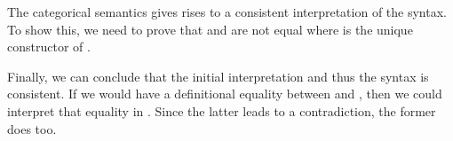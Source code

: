 
The categorical semantics gives rises to a consistent interpretation of the syntax.
To show this, we need to prove that   and   are not equal where  is the unique constructor of .

\begin{code}%
\>[0]\AgdaSpace{}%
\AgdaSymbol{:}\AgdaSpace{}%
\AgdaSpace{}%
\<%
\end{code}


Finally, we can conclude that the initial interpretation and thus the syntax is consistent.
If we would have a definitional equality between  and , then we could interpret that equality in .
Since the latter leads to a contradiction, the former does too.

\begin{code}%
\>[0]\AgdaSpace{}%
\AgdaSymbol{:}\AgdaSpace{}%
\AgdaSpace{}%
\<%
\\
\>[0]\AgdaSpace{}%
\AgdaSpace{}%
\AgdaSymbol{=}\AgdaSpace{}%
\AgdaSpace{}%
\AgdaSymbol{(}\AgdaSpace{}%
\AgdaSpace{}%
\AgdaSpace{}%
\AgdaSymbol{)}\<%
\end{code}

